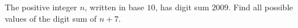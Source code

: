 The positive integer $n$, written in base $10$, has digit sum $2009$. Find all possible values of the digit sum of $n+7$.
